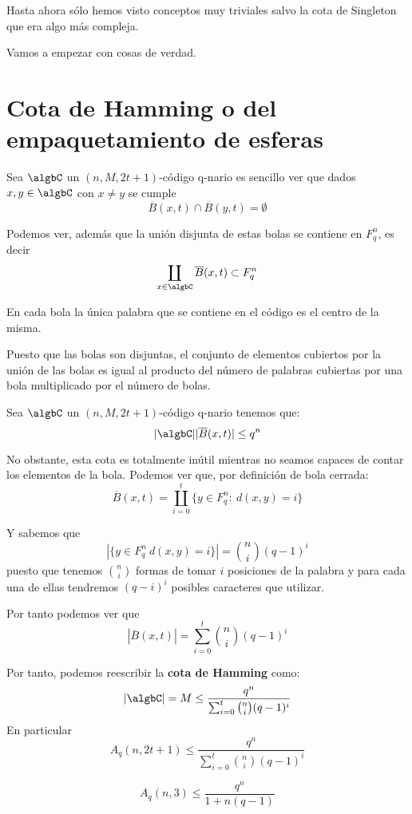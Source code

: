 Hasta ahora sólo hemos visto conceptos muy triviales salvo la cota de Singleton que era algo más compleja.

Vamos a empezar con cosas de verdad.

\section{Cota de Hamming o del empaquetamiento de esferas}

Sea $\algbC$ un $(n,M,2t+1)$-código q-nario es sencillo ver que dados $x,y \in \algbC$ con $x \neq y $ se cumple
\[\overline{B}(x,t) \cap \overline{B}(y,t) = \emptyset\]

Podemos ver, además que la unión disjunta de estas bolas se contiene en $F_q^n$, es decir
\[\coprod_{x \in \algbC} \overline{B}(x,t) \subset F_q^n\]

\obs En cada bola la única palabra que se contiene en el código es el centro de la misma.

Puesto que las bolas son disjuntas, el conjunto de elementos cubiertos por la unión de las bolas es igual al producto del número de palabras cubiertas por una bola multiplicado por el número de bolas.

\begin{defn}
Sea $\algbC$ un $(n,M,2t+1)$-código q-nario tenemos que:
\[|\algbC| |\overline{B}(x,t)| \leq q^n\]
\end{defn}

No obstante, esta cota es totalmente inútil mientras no seamos capaces de contar los elementos de la bola. Podemos ver que, por definición de bola cerrada:
\[\overline{B}(x,t) = \coprod_{i=0}^t\{y \in F_q^n: \ d(x,y)=i\}\]

Y sabemos que
\[|\{y \in F_q^n \ d(x,y)=i\}| = {n \choose i} (q-1)^i\]
puesto que tenemos ${n \choose i}$ formas de tomar $i$ posiciones de la palabra y para cada una de ellas tendremos $(q-i)^i$ posibles caracteres que utilizar.

Por tanto podemos ver que
\[|\overline{B}(x,t)| = \sum_{i=0}^t {n \choose i} (q-1)^i\]

Por tanto, podemos reescribir la \textbf{cota de Hamming} como:
\[|\algbC|=M \leq \frac{q^n}{\sum_{i=0}^t {n \choose i} (q-1)^i}\]
En particular
\[A_q(n,2t+1) \leq \frac{q^n}{\sum_{i=0}^t {n \choose i} (q-1)^i}\]

\begin{example}
\[A_q(n,3) \leq \frac{q^n}{1+n(q-1)}\]
\end{example}

